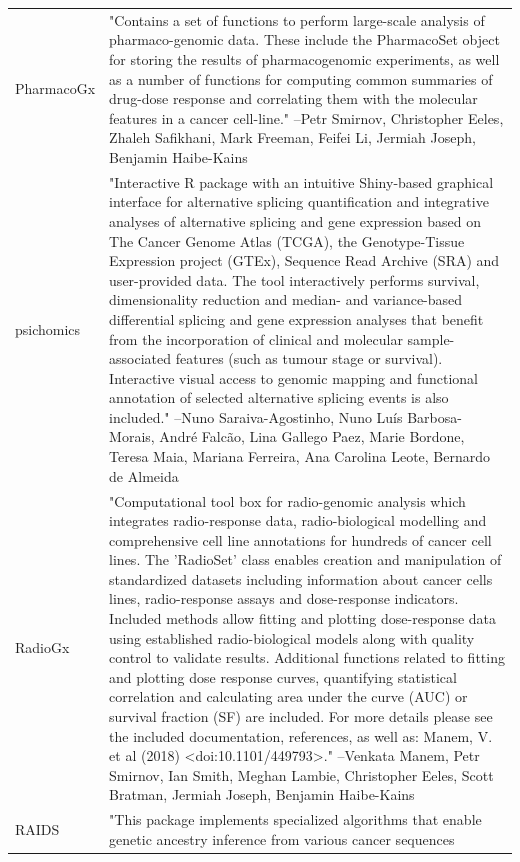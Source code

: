 \begin{longtable}[t]{l>{\raggedright\arraybackslash}p{25em}}
PharmacoGx & "Contains a set of functions to perform large-scale
analysis of pharmaco-genomic data. These include the
PharmacoSet object for storing the results of pharmacogenomic
experiments, as well as a number of functions for computing
common summaries of drug-dose response and correlating them
with the molecular features in a cancer cell-line." --Petr Smirnov, Christopher Eeles, Zhaleh Safikhani, Mark Freeman, Feifei Li, Jermiah Joseph, Benjamin Haibe-Kains\\
psichomics & "Interactive R package with an intuitive Shiny-based
graphical interface for alternative splicing quantification and
integrative analyses of alternative splicing and gene
expression based on The Cancer Genome Atlas (TCGA), the
Genotype-Tissue Expression project (GTEx), Sequence Read
Archive (SRA) and user-provided data. The tool interactively
performs survival, dimensionality reduction and median- and
variance-based differential splicing and gene expression
analyses that benefit from the incorporation of clinical and
molecular sample-associated features (such as tumour stage or
survival). Interactive visual access to genomic mapping and
functional annotation of selected alternative splicing events
is also included." --Nuno Saraiva-Agostinho, Nuno Luís Barbosa-Morais, André Falcão, Lina Gallego Paez, Marie Bordone, Teresa Maia, Mariana Ferreira, Ana Carolina Leote, Bernardo de Almeida\\
\addlinespace
RadioGx & "Computational tool box for radio-genomic analysis which
integrates radio-response data, radio-biological modelling and
comprehensive cell line annotations for hundreds of cancer cell
lines. The 'RadioSet' class enables creation and manipulation
of standardized datasets including information about cancer
cells lines, radio-response assays and dose-response
indicators. Included methods allow fitting and plotting
dose-response data using established radio-biological models
along with quality control to validate results. Additional
functions related to fitting and plotting dose response curves,
quantifying statistical correlation and calculating area under
the curve (AUC) or survival fraction (SF) are included. For
more details please see the included documentation, references,
as well as: Manem, V. et al (2018) <doi:10.1101/449793>." --Venkata Manem, Petr Smirnov, Ian Smith, Meghan Lambie, Christopher Eeles, Scott Bratman, Jermiah Joseph, Benjamin Haibe-Kains\\
RAIDS & "This package implements specialized algorithms that enable
genetic ancestry inference from various cancer sequences

\end{longtable}
